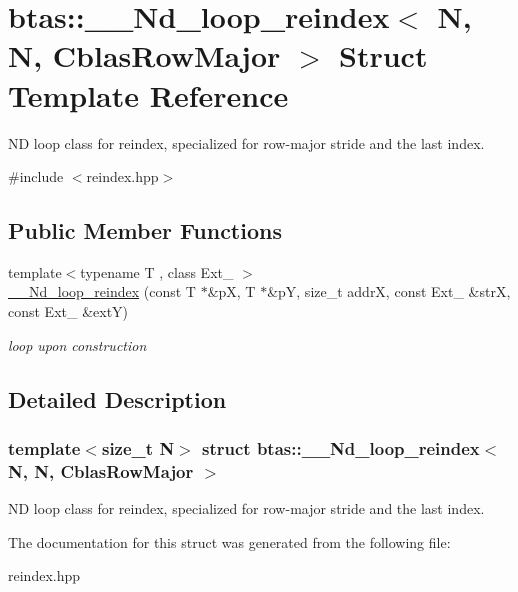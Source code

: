 \hypertarget{structbtas_1_1_____nd__loop__reindex_3_01_n_00_01_n_00_01_cblas_row_major_01_4}{
\section{btas::\_\-\_\-Nd\_\-loop\_\-reindex$<$ N, N, CblasRowMajor $>$ Struct Template Reference}
\label{structbtas_1_1_____nd__loop__reindex_3_01_n_00_01_n_00_01_cblas_row_major_01_4}
}


ND loop class for reindex, specialized for row-\/major stride and the last index.  


{\ttfamily \#include $<$reindex.hpp$>$}\subsection*{Public Member Functions}
\begin{DoxyCompactItemize}
\item 
\hypertarget{structbtas_1_1_____nd__loop__reindex_3_01_n_00_01_n_00_01_cblas_row_major_01_4_a832307779209aacf5932d60db02d42a2}{
{\footnotesize template$<$typename T , class Ext\_\- $>$ }\\\hyperlink{structbtas_1_1_____nd__loop__reindex_3_01_n_00_01_n_00_01_cblas_row_major_01_4_a832307779209aacf5932d60db02d42a2}{\_\-\_\-Nd\_\-loop\_\-reindex} (const T $\ast$\&pX, T $\ast$\&pY, size\_\-t addrX, const Ext\_\- \&strX, const Ext\_\- \&extY)}
\label{structbtas_1_1_____nd__loop__reindex_3_01_n_00_01_n_00_01_cblas_row_major_01_4_a832307779209aacf5932d60db02d42a2}

\begin{DoxyCompactList}\small\item\em loop upon construction \item\end{DoxyCompactList}\end{DoxyCompactItemize}


\subsection{Detailed Description}
\subsubsection*{template$<$size\_\-t N$>$ struct btas::\_\-\_\-Nd\_\-loop\_\-reindex$<$ N, N, CblasRowMajor $>$}

ND loop class for reindex, specialized for row-\/major stride and the last index. 

The documentation for this struct was generated from the following file:\begin{DoxyCompactItemize}
\item 
reindex.hpp\end{DoxyCompactItemize}

